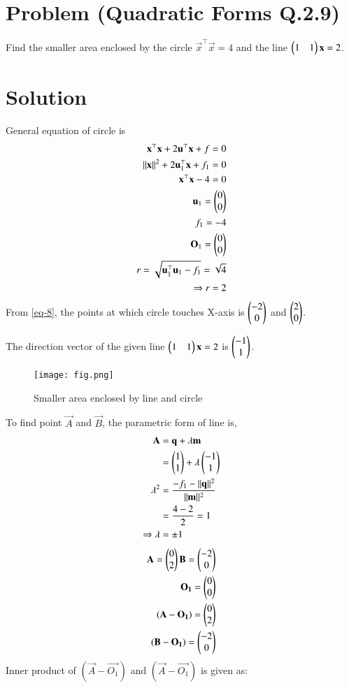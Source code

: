 \documentclass[journal,12pt,twocolumn]{IEEEtran}
\begin{document}
\section*{\textbf{Problem (Quadratic Forms Q.2.9)}}
Find the smaller area enclosed by the circle $\vec{x}^\top\vec{x}=4$ and the line $\begin{pmatrix}1 & 1\end{pmatrix}\mathbf{x}=2$.
\section*{\textbf{Solution}}
General equation of circle is
\begin{align}
    \mathbf{x}^\top\mathbf{x}+2\mathbf{u}^\top\mathbf{x}+f=0 \\
    \lVert\mathbf{x}\rVert^2+2\mathbf{u}_1^\top\mathbf{x}+f_1=0 \\
    \mathbf{x}^\top\mathbf{x} - 4 = 0 \\
    \mathbf{u}_1=\begin{pmatrix}0\\0\end{pmatrix} \\
    f_1 = -4 \\
    \mathbf{O}_1 = \begin{pmatrix}0\\0\end{pmatrix} \\
    r = \sqrt{\mathbf{u}_1^\top\mathbf{u}_1 - f_1} = \sqrt{4} \\
    \Rightarrow r = 2 \label{eq-8}
\end{align}
From \eqref{eq-8}, the points at which circle touches X-axis is $\begin{pmatrix}-2\\0\end{pmatrix}$ and $\begin{pmatrix}2\\0\end{pmatrix}$.

The direction vector of the given line $\begin{pmatrix}1 & 1\end{pmatrix}\mathbf{x}=2$ is $\begin{pmatrix}-1\\1\end{pmatrix}$.

\begin{figure}[!h]
\centering
\texttt{[image: fig.png]}
\caption{Smaller area enclosed by line and circle}
\end{figure}

To find point $\vec{A}$ and $\vec{B}$, the parametric form of line is,
\begin{align}
    \mathbf{A}&=\mathbf{q}+\lambda\mathbf{m} \\
    &= \begin{pmatrix}1\\1\end{pmatrix}+\lambda\begin{pmatrix}-1\\1\end{pmatrix} \\
    \lambda^2 &= \frac{-f_1-\lVert\mathbf{q}\rVert^2}{\lVert\mathbf{m}\rVert^2} \\
    &= \frac{4-2}{2} = 1 \\
    \Rightarrow \lambda &= \pm 1
\end{align}
\begin{align}
    \mathbf{A} = \begin{pmatrix}0\\2\end{pmatrix} \mathbf{B} = \begin{pmatrix}-2\\0\end{pmatrix} \\
    \mathbf{O_1} = \begin{pmatrix}0\\0\end{pmatrix} \\
    (\mathbf{A} - \mathbf{O_1}) = \begin{pmatrix}0\\2\end{pmatrix} \\
    (\mathbf{B} - \mathbf{O_1}) = \begin{pmatrix}-2\\0\end{pmatrix}
\end{align}
Inner product of $(\vec{A} - \vec{O_1})$ and $(\vec{A} - \vec{O_1})$ is given as: \\
\end{document}
